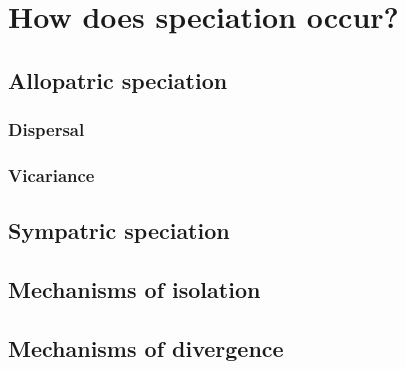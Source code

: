 \section{How does speciation occur?}

\subsection{Allopatric speciation}

\subsubsection{Dispersal}

\begin{frame}
    \frametitle{}
\end{frame}

\subsubsection{Vicariance}

\subsection{Sympatric speciation}

\subsection[]{Mechanisms of isolation}

\subsection[]{Mechanisms of divergence}




\clickerslide{
\begin{frame}
    \begin{clickerquestion}
        \item 
        \begin{clickeroptions}
            \item 
            \item 
            \item 
            \item 
        \end{clickeroptions}
    \end{clickerquestion}
\end{frame}
}

